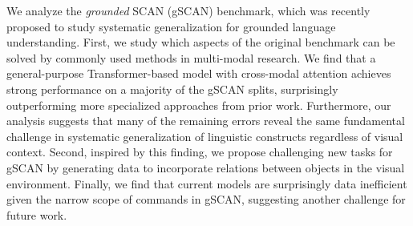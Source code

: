 We analyze the \emph{grounded} SCAN (gSCAN) benchmark, which was recently proposed to study systematic generalization for grounded language understanding. First, we study which aspects of the original benchmark can be solved by commonly used methods in multi-modal research. We find that a general-purpose Transformer-based model with cross-modal attention achieves strong performance on a majority of the gSCAN splits, surprisingly outperforming more specialized approaches from prior work. Furthermore, our analysis suggests that many of the remaining errors reveal the same fundamental challenge in systematic generalization of linguistic constructs regardless of visual context. Second, inspired by this finding, we propose challenging new tasks for gSCAN by generating data to incorporate relations between objects in the visual environment. Finally, we find that current models are surprisingly data inefficient given the narrow scope of commands in gSCAN, suggesting another challenge for future work.
